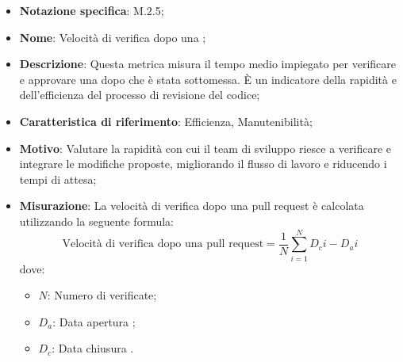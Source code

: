 \begin{itemize}
    \item \textbf{Notazione specifica}: M.2.5;
    \item \textbf{Nome}: Velocità di verifica dopo una ;
    \item \textbf{Descrizione}: Questa metrica misura il tempo medio impiegato per verificare e approvare una  dopo che è stata sottomessa. È un indicatore della rapidità e dell'efficienza del processo di revisione del codice;
    \item \textbf{Caratteristica di riferimento}: Efficienza, Manutenibilità;
    \item \textbf{Motivo}: Valutare la rapidità con cui il team di sviluppo riesce a verificare e integrare le modifiche proposte, migliorando il flusso di lavoro e riducendo i tempi di attesa;
    \item \textbf{Misurazione}: La velocità di verifica dopo una pull request è calcolata utilizzando la seguente formula:
    \[
        \text{Velocità di verifica dopo una pull request} =\frac{1}{N} \sum_{i=1}^{N} D_{c}i - D_{a}i 
    \]
    dove:
    \begin{itemize}
        \item $N$: Numero di  verificate;
        \item $D_{a}$: Data apertura ;
        \item $D_{c}$: Data chiusura .
    \end{itemize}
\end{itemize}
